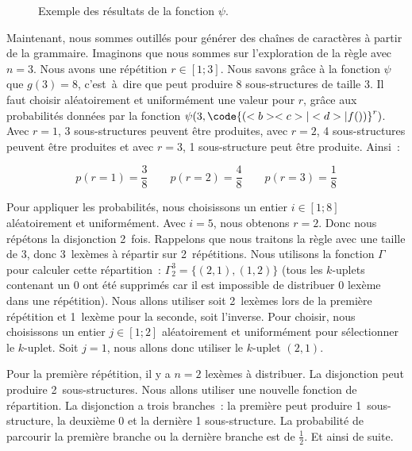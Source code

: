 \begin{example}
\begin{figure}
\begin{center}
\begin{tabular}{c|cc|cccccccccccc}
\hline

\end{tabular}
\end{center}

\caption{\label{figure:data:random_tabular} Exemple des résultats de la fonction
$\psi$.}

\end{figure}

Maintenant, nous sommes outillés pour générer des chaînes de caractères à partir
de la grammaire. Imaginons que nous sommes sur l'exploration de la règle
 avec $n = 3$. Nous avons une répétition $r \in [1; 3]$. Nous savons
grâce à la fonction $\psi$ que $g(3) = 8$, c'est~à~dire que  peut
produire 8 sous-structures de taille 3. Il faut choisir aléatoirement et
uniformément une valeur pour $r$, grâce aux probabilités données par la fonction
$\psi(3, \code{( <b> <c> | <d> | f() )}^r)$. Avec $r = 1$, 3 sous-structures
peuvent être produites, avec $r = 2$, 4 sous-structures peuvent être produites
et avec $r = 3$, 1 sous-structure peut être produite. Ainsi~:

$$
p(r = 1) = \frac{3}{8} \qquad
p(r = 2) = \frac{4}{8} \qquad
p(r = 3) = \frac{1}{8}
$$

Pour appliquer les probabilités, nous choisissons un entier $i \in [1; 8]$
aléatoirement et uniformément. Avec $i = 5$, nous obtenons $r = 2$.
%
%
%
%
%
%
%
%
Donc nous répétons la disjonction 2~fois. Rappelons que nous traitons la règle
 avec une taille de 3, donc 3~lexèmes à répartir sur 2~répétitions. Nous
utilisons la fonction $\Gamma$ pour calculer cette répartition~: $\Gamma_2^3 =
\{(2, 1), (1, 2)\}$ (tous les $k$-uplets contenant un 0 ont été supprimés car il
est impossible de distribuer 0 lexème dans une répétition). Nous allons utiliser
soit 2~lexèmes lors de la première répétition et 1~lexème pour la seconde, soit
l'inverse. Pour choisir, nous choisissons un entier $j \in [1; 2]$ aléatoirement
et uniformément pour sélectionner le $k$-uplet. Soit $j = 1$, nous allons donc
utiliser le $k$-uplet $(2, 1)$.

Pour la première répétition, il y a $n = 2$ lexèmes à distribuer. La disjonction
peut produire 2~sous-structures. Nous allons utiliser une nouvelle fonction de
répartition. La disjonction a trois branches~: la première peut produire
1~sous-structure, la deuxième 0 et la dernière 1 sous-structure.  La probabilité
de parcourir la première branche ou la dernière branche est de $\tfrac{1}{2}$.
Et ainsi de suite.

\end{example}

